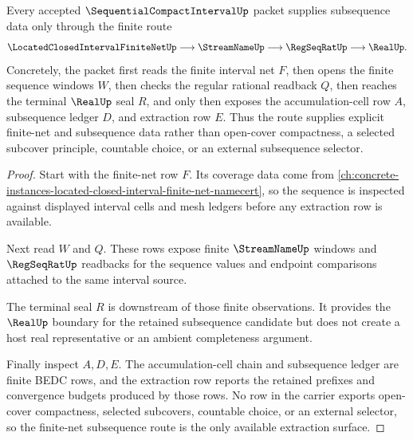 \begin{theorem}
\label{thm:sequential-compact-interval-finite-net-subsequence-extraction}
Every accepted $\SequentialCompactIntervalUp$ packet supplies subsequence data only through the finite route
$$
\LocatedClosedIntervalFiniteNetUp \longrightarrow \StreamNameUp \longrightarrow \RegSeqRatUp \longrightarrow \RealUp .
$$
Concretely, the packet first reads the finite interval net $F$, then opens the finite sequence windows $W$, then checks the regular rational readback $Q$, then reaches the terminal $\RealUp$ seal $R$, and only then exposes the accumulation-cell row $A$, subsequence ledger $D$, and extraction row $E$. Thus the route supplies explicit finite-net and subsequence data rather than open-cover compactness, a selected subcover principle, countable choice, or an external subsequence selector.
\end{theorem}
\begin{proof}
Start with the finite-net row $F$. Its coverage data come from \autoref{ch:concrete-instances-located-closed-interval-finite-net-namecert}, so the sequence is inspected against displayed interval cells and mesh ledgers before any extraction row is available.

Next read $W$ and $Q$. These rows expose finite $\StreamNameUp$ windows and $\RegSeqRatUp$ readbacks for the sequence values and endpoint comparisons attached to the same interval source.

The terminal seal $R$ is downstream of those finite observations. It provides the $\RealUp$ boundary for the retained subsequence candidate but does not create a host real representative or an ambient completeness argument.

Finally inspect $A,D,E$. The accumulation-cell chain and subsequence ledger are finite BEDC rows, and the extraction row reports the retained prefixes and convergence budgets produced by those rows. No row in the carrier exports open-cover compactness, selected subcovers, countable choice, or an external selector, so the finite-net subsequence route is the only available extraction surface.
\end{proof}


